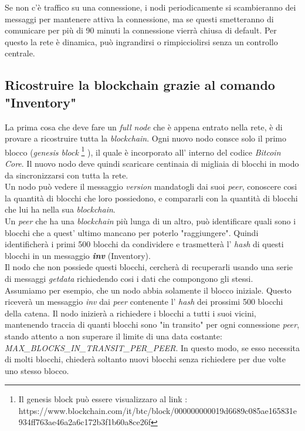 Se non c'\`e traffico su una connessione, i nodi periodicamente si scambieranno dei messaggi per mantenere attiva la connessione, ma se questi smetteranno di comunicare per pi\`u di 90 minuti la connessione vierr\`a chiusa di default. Per questo la rete  \`e dinamica, pu\`o ingrandirsi o rimpicciolirsi senza un controllo centrale.

\subsection{Ricostruire la blockchain grazie al comando "Inventory"}
La prima cosa che deve fare un \textit{full node} che \`e appena entrato nella rete, \`e di provare a ricostruire tutta la \textit{blockchain}. Ogni nuovo nodo consce solo il primo blocco (\textit{genesis block} \footnote{Il genesis block pu\`o essere visualizzaro al link : https://www.blockchain.com/it/btc/block/000000000019d6689c085ae165831e934ff763ae46a2a6c172b3f1b60a8ce26f} ), il quale \`e incorporato all' interno del codice \textit{Bitcoin Core}. Il nuovo nodo deve quindi scaricare centinaia di migliaia di blocchi in modo da sincronizzarsi con tutta la rete.\\
Un nodo pu\`o vedere il messaggio \textit{version} mandatogli dai suoi \textit{peer}, conoscere cosi la quantit\`a di blocchi che loro possiedono, e compararli con la quantit\`a di blocchi che lui ha nella sua \textit{blockchain}.\\
Un \textit{peer} che ha una \textit{blockchain} pi\`u lunga di un altro, pu\`o identificare quali sono i blocchi che a quest' ultimo mancano per poterlo "raggiungere". Quindi identificher\`a i primi 500 blocchi da condividere e trasmetter\`a l' \textit{hash} di questi blocchi in un messaggio \textbf{\textit{inv}} (Inventory).\\
Il nodo che non possiede questi blocchi, cercher\`a di recuperarli usando una serie di messaggi \textit{getdata} richiedendo cosi i dati che compongono gli stessi.\\
Assumiamo per esempio, che un nodo abbia solamente il blocco iniziale. Questo ricever\`a un messaggio \textit{inv} dai \textit{ peer} contenente l' \textit{hash} dei prossimi 500 blocchi della catena. Il nodo inizier\`a a richiedere i blocchi a tutti i suoi vicini, mantenendo traccia di quanti blocchi sono "in transito" per ogni connessione \textit{peer}, stando attento a non superare il limite di una data costante: \textit{MAX\_BLOCKS\_IN\_TRANSIT\_PER\_PEER}. In questo modo, se esso necessita di molti blocchi, chieder\`a soltanto nuovi blocchi senza richiedere per due volte uno stesso blocco.


